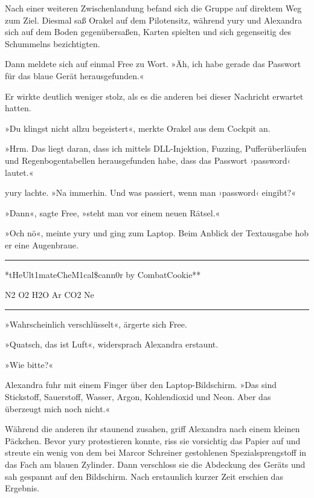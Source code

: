 Nach einer weiteren Zwischenlandung befand sich die Gruppe auf direktem Weg zum Ziel. Diesmal saß Orakel auf dem Pilotensitz, während yury und Alexandra sich auf dem Boden gegenübersaßen, Karten spielten und sich gegenseitig des Schummelns bezichtigten.

Dann meldete sich auf einmal Free zu Wort. »Äh, ich habe gerade das Passwort für das blaue Gerät herausgefunden.«

Er wirkte deutlich weniger stolz, als es die anderen bei dieser Nachricht erwartet hatten.

»Du klingst nicht allzu begeistert«, merkte Orakel aus dem Cockpit an.

»Hrm. Das liegt daran, dass ich mittels DLL-Injektion, Fuzzing, Pufferüberläufen und Regenbogentabellen herausgefunden habe, dass das Passwort ›password‹ lautet.«

yury lachte. »Na immerhin. Und was passiert, wenn man ›password‹ eingibt?«

»Dann«, sagte Free, »steht man vor einem neuen Rätsel.«

»Och nö«, meinte yury und ging zum Laptop. Beim Anblick der Textausgabe hob er eine Augenbraue.

\noindent \parbox{\textwidth}{ \vspace{3ex} \hrule \vspace{3ex}

    \begin{footnotesize}
    \begin{ttfamily}

\noindent **tHeUlt1mateCheM1cal\$cann0r by CombatCookie**

\noindent N2 O2 H2O Ar CO2 Ne

    \end{ttfamily}
    \end{footnotesize}

\vspace{3ex} \hrule \vspace{3ex} }

»Wahrscheinlich verschlüsselt«, ärgerte sich Free.

»Quatsch, das ist Luft«, widersprach Alexandra erstaunt.

»Wie bitte?«

Alexandra fuhr mit einem Finger über den Laptop-Bildschirm. »Das sind Stickstoff, Sauerstoff, Wasser, Argon, Kohlendioxid und Neon. Aber das überzeugt mich noch nicht.«

Während die anderen ihr staunend zusahen, griff Alexandra nach einem kleinen Päckchen. Bevor yury protestieren konnte, riss sie vorsichtig das Papier auf und streute ein wenig von dem bei Marcor Schreiner gestohlenen Spezialsprengstoff in das Fach am blauen Zylinder. Dann verschloss sie die Abdeckung des Geräts und sah gespannt auf den Bildschirm. Nach erstaunlich kurzer Zeit erschien das Ergebnis.

